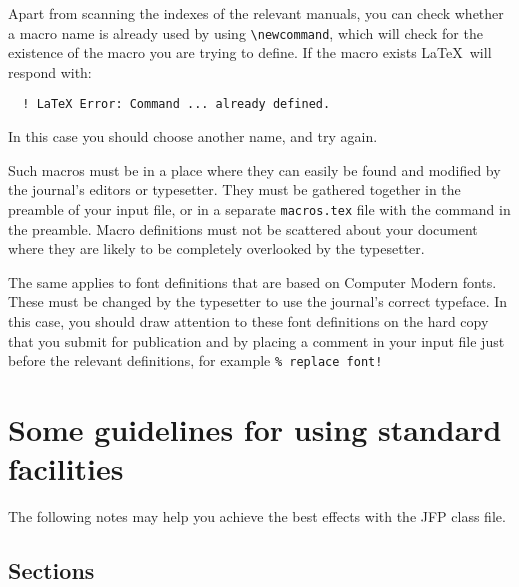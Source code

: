 \documentclass{jfp1}
\begin{document}
Apart from scanning the indexes of the relevant manuals, you can check
whether a macro name is already used by using \verb"\newcommand", which
will check for the existence of the macro you are trying to define.
If the macro exists \LaTeX\ will respond with:
%
\begin{verbatim}
  ! LaTeX Error: Command ... already defined.
\end{verbatim}
%
In this case you should choose another name, and try again.

Such macros must be in a place where they can easily be found and
modified by the journal's editors or typesetter. They must be gathered
together in the preamble of your input file, or in a separate
\verb"macros.tex" file with the command \verb"" in the
preamble. Macro definitions must not be scattered about your document
where they are likely to be completely overlooked by the typesetter.

The same applies to font definitions that are based on Computer Modern
fonts. These must be changed by the typesetter to use the journal's
correct typeface. In this case, you should draw
attention to these font definitions on the hard copy that you submit for
publication and by placing a comment in your input file just before the
relevant definitions, for example \verb"% replace font!"

\section{Some guidelines for using standard facilities}

The following notes may help you achieve the best effects with the JFP class file.

\subsection{Sections}
\end{document}
